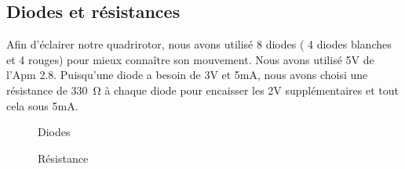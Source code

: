 	\subsection {Diodes  et résistances}
	Afin d'éclairer notre quadrirotor, nous avons utilisé 8 diodes ( 4 diodes blanches et 4  rouges) pour mieux connaître son mouvement. Nous avons utilisé 5V de l'Apm 2.8. Puisqu'une diode a besoin de 3V et 5mA, nous avons choisi une résistance de \SI{330}{\ohm} à chaque diode pour encaisser les 2V supplémentaires et tout cela sous 5mA.
	\begin{figure}[h]
		\centering
		\begin{minipage}{0.49\textwidth}
			\hspace*{-0.7cm}
		\centering
			\caption{Diodes}
			\label{fig:my_label}
		\end{minipage}
		\begin{minipage}{0.49\textwidth}
		\hspace*{0.2cm}	
		\centering
			\caption{Résistance}
		\label{fig:my_label}
		\end{minipage}
	\end{figure}
